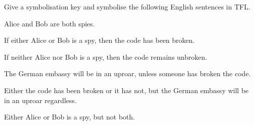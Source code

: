 \solutions
{} %
\problempart
\label{pr.spies}
Give a symbolisation key and symbolise the following English sentences in TFL.
\begin{earg}
\item Alice and Bob are both spies.
\item[] 
\item If either Alice or Bob is a spy, then the code has been broken.
\item[] 
\item If neither Alice nor Bob is a spy, then the code remains unbroken.
\item[] 
\item The German embassy will be in an uproar, unless someone has broken the code.
\item[] 
\item Either the code has been broken or it has not, but the German embassy will be in an uproar regardless.
\item[] 
\item Either Alice or Bob is a spy, but not both.
\item[] 
\end{earg}


